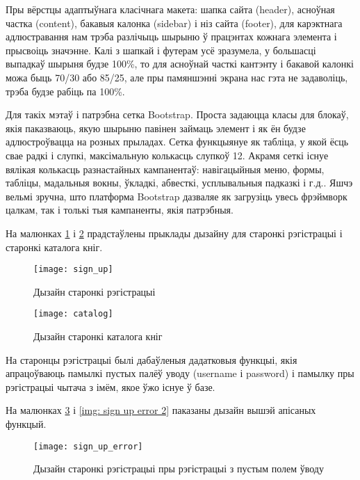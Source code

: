 Пры вёрстцы адаптыўнага класічнага макета: шапка сайта (header), асноўная частка (con\-tent), бакавыя калонка (sidebar) і ніз сайта (footer), для карэктнага адлюстравання нам трэба разлічыць шырыню ў працэнтах кожнага элемента і прысвоіць значэнне. Калі з шапкай і футерам усё зразумела, у большасці выпадкаў шырыня будзе 100\%, то для асноўнай часткі кантэнту і бакавой калонкі можа быць 70/30 або 85/25, але пры памяншэнні экрана нас гэта не задаволіць, трэба будзе рабіць па 100\%.

Для такіх мэтаў і патрэбна сетка Bootstrap. Проста задаюцца класы для блокаў, якія паказваюць, якую шырыню павінен займаць элемент і як ён будзе адлюстроўвацца на розных прыладах. Сетка функцыянуе як табліца, у якой ёсць свае радкі і слупкі, максімальную колькасць слупкоў 12.
Акрамя сеткі існуе вялікая колькасць разнастайных кампанентаў: навігацыйныя меню, формы, табліцы, мадальныя вокны, ўкладкі, абвесткі, усплывальныя падказкі і г.д..
Яшчэ вельмі зручна, што платформа Bootstrap дазваляе як загрузіць увесь фрэймворк цалкам, так і толькі тыя кампаненты, якія патрэбныя.

На малюнках \ref{img: sign up sample} і \ref{img: catalog sample} прадстаўлены прыклады дызайну для старонкі
рэгістрацыі і старонкі каталога кніг.

\begin{figure}[h!]
    \centering
    \texttt{[image: sign\_up]}
    \caption{Дызайн старонкі рэгістрацыі}
    \label{img: sign up sample} 
\end{figure}

\begin{figure}[h!]
    \centering
    \texttt{[image: catalog]}
    \caption{Дызайн старонкі каталога кніг}
    \label{img: catalog sample} 
\end{figure}

На старонцы рэгістрацыі былі дабаўленыя дадатковыя функцыі, якія апрацоўваюць памылкі пустых палёў уводу
(username і password) і памылку пры рэгістрацыі чытача з імём, якое ўжо існуе ў базе.

На малюнках \ref{img: sign up error} і \ref{img: sign up error 2} паказаны дызайн вышэй апісаных функцый.

\begin{figure}[h!]
    \centering
    \texttt{[image: sign\_up\_error]}
    \caption{Дызайн старонкі рэгістрацыі пры рэгістрацыі з пустым полем ўводу}
    \label{img: sign up error} 
\end{figure}

